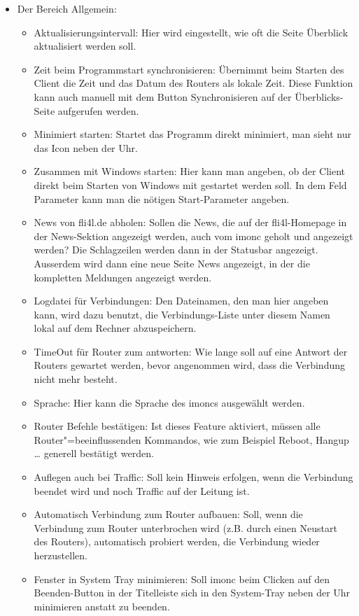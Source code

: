   \begin{itemize}
  \item Der Bereich Allgemein:
    \begin{itemize}
    \item Aktualisierungsintervall: Hier wird eingestellt, wie oft die Seite
      Überblick aktualisiert werden soll.
    \item Zeit beim Programmstart synchronisieren: Übernimmt beim Starten des
      Client die Zeit und das Datum des Routers als lokale Zeit. Diese Funktion 
      kann auch manuell mit dem Button Synchronisieren auf der Überblicks-Seite 
      aufgerufen werden.
    \item Minimiert starten: Startet das Programm direkt minimiert, man sieht 
      nur das Icon neben der Uhr.
    \item Zusammen mit Windows starten: Hier kann man angeben, ob der Client 
      direkt beim Starten von Windows mit gestartet werden soll. In dem Feld 
      Parameter kann man die nötigen Start-Parameter angeben.
    \item News von fli4l.de abholen: Sollen die News, die auf der fli4l-Homepage 
      in der News-Sektion angezeigt werden, auch vom imonc geholt und angezeigt 
      werden? Die Schlagzeilen werden dann in der Statusbar angezeigt. Ausserdem 
      wird dann eine neue Seite News angezeigt, in der die kompletten Meldungen 
      angezeigt werden.
    \item Logdatei für Verbindungen: Den Dateinamen, den man hier angeben kann, 
      wird dazu benutzt, die Verbindungs-Liste unter diesem Namen lokal auf dem 
      Rechner abzuspeichern.
    \item TimeOut für Router zum antworten: Wie lange soll auf eine Antwort der 
      Routers gewartet werden, bevor angenommen wird, dass die Verbindung nicht 
      mehr besteht.
    \item Sprache: Hier kann die Sprache des imoncs ausgewählt werden.
    \item Router Befehle bestätigen: Ist dieses Feature aktiviert, müssen alle 
      Router"=beeinflussenden Kommandos, wie zum Beispiel Reboot, Hangup \ldots
      generell bestätigt werden.
    \item Auflegen auch bei Traffic: Soll kein Hinweis erfolgen, wenn die 
      Verbindung beendet wird und noch Traffic auf der Leitung ist.
    \item Automatisch Verbindung zum Router aufbauen: Soll, wenn die Verbindung 
      zum Router unterbrochen wird (z.B. durch einen Neustart des Routers),
      automatisch probiert werden, die Verbindung wieder herzustellen.
    \item Fenster in System Tray minimieren: Soll imonc beim Clicken auf den 
      Beenden-Button in der Titelleiste sich in den System-Tray neben der Uhr
      minimieren anstatt zu beenden.
    \end{itemize}


\end{itemize}
